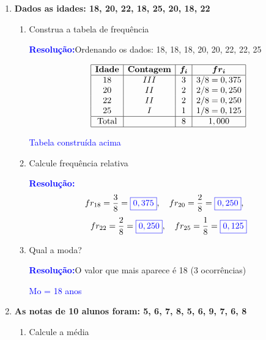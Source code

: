 \documentclass[11pt]{article}
\newcommand{\respostaNum}[1]{\textcolor{blue}{\boxed{#1}}}   %
\newcommand{\respostaTxt}[1]{\textcolor{blue}{#1}}           %
\newcommand{\resolucao}{\textbf{\textcolor{blue}{Resolução:}}}
\begin{document}
\begin{multicols}{2}
\begin{enumerate}[leftmargin=*]
\begin{enumerate}[label=\alph*)]
\respostaTxt{Quantitativa Contínua}

\item Marca de celular

\resolucao Qualitativa nominal (sem ordem: Samsung, Apple, Motorola, \ldots)

\respostaTxt{Qualitativa Nominal}
\end{enumerate}

\item \textbf{Dados as idades: 18, 20, 22, 18, 25, 20, 18, 22}

\begin{enumerate}[label=\alph*)]
\item Construa a tabela de frequência

\resolucao Ordenando os dados: 18, 18, 18, 20, 20, 22, 22, 25

\[
\begin{array}{|c|c|c|c|}
\hline
\textbf{Idade} & \textbf{Contagem} & \boldsymbol{f_i} & \boldsymbol{fr_i} \\
\hline
18 & III & 3 & 3/8 = 0,375 \\
20 & II & 2 & 2/8 = 0,250 \\
22 & II & 2 & 2/8 = 0,250 \\
25 & I & 1 & 1/8 = 0,125 \\
\hline
\text{Total} & & 8 & 1,000 \\
\hline
\end{array}
\]

\respostaTxt{Tabela construída acima}

\item Calcule frequência relativa

\resolucao
\[
fr_{18} = \frac{3}{8} = \respostaNum{0,375}, \quad
fr_{20} = \frac{2}{8} = \respostaNum{0,250}, \quad
\]
\[ fr_{22} = \frac{2}{8} = \respostaNum{0,250}, \quad
fr_{25} = \frac{1}{8} = \respostaNum{0,125}
\]

\item Qual a moda?

\resolucao O valor que mais aparece é 18 (3 ocorrências)

\respostaTxt{Mo = 18 anos}
\end{enumerate}

\item \textbf{As notas de 10 alunos foram: 5, 6, 7, 8, 5, 6, 9, 7, 6, 8}

\begin{enumerate}[label=\alph*)]
\item Calcule a média


\end{enumerate}
\end{enumerate}
\end{multicols}
\end{document}
